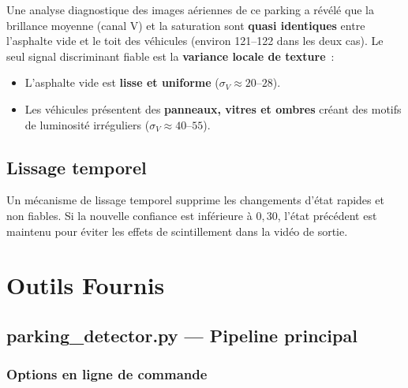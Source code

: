 \documentclass[12pt,a4paper]{report}
\begin{document}
Une analyse diagnostique des images aériennes de ce parking a révélé que la brillance moyenne (canal V) et la saturation sont \textbf{quasi identiques} entre l'asphalte vide et le toit des véhicules (environ 121–122 dans les deux cas). Le seul signal discriminant fiable est la \textbf{variance locale de texture}~:

\begin{itemize}
  \item L'asphalte vide est \textbf{lisse et uniforme} ($\sigma_V \approx 20$–$28$).
  \item Les véhicules présentent des \textbf{panneaux, vitres et ombres} créant des motifs de luminosité irréguliers ($\sigma_V \approx 40$–$55$).
\end{itemize}

\section{Lissage temporel}

Un mécanisme de lissage temporel supprime les changements d'état rapides et non fiables. Si la nouvelle confiance est inférieure à $0{,}30$, l'état précédent est maintenu pour éviter les effets de scintillement dans la vidéo de sortie.

\chapter{Outils Fournis}

\section{parking\_detector.py — Pipeline principal}

\subsection{Options en ligne de commande}
\end{document}
